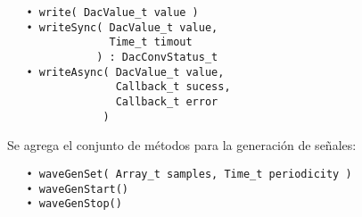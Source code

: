 
\begin{verbatim}
   • write( DacValue_t value )
   • writeSync( DacValue_t value, 
                Time_t timout 
              ) : DacConvStatus_t
   • writeAsync( DacValue_t value, 
                 Callback_t sucess, 
                 Callback_t error 
               )
\end{verbatim}

Se agrega el conjunto de métodos para la generación de señales:

\begin{verbatim}
   • waveGenSet( Array_t samples, Time_t periodicity )
   • waveGenStart()
   • waveGenStop()
\end{verbatim}
